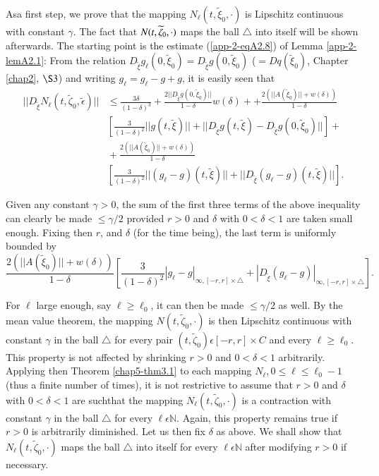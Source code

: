 \medskip
{} As\pageoriginale a first
step, we prove that the mapping $N_{\ell}(t,  \widetilde{\xi}_{0},
\cdot)$ is Lipschitz continuous with constant $\gamma$. The fact that
$N(t,\break\widetilde{\zeta}_{0}, \cdot)$ maps the ball $\triangle$ into
itself will be shown afterwards. The starting point is the estimate
(\ref{app-2-eqA2.8}) of Lemma \ref{app-2-lemA2.1}: From the relation $D_{
  \widetilde{\xi}}g_{\ell}(0,  \widetilde{\xi}_{0}) = D_{
  \widetilde{\xi}}g(0,  \widetilde{\xi}_{0})$ ($= Dq(
\widetilde{\xi}_{0})$, Chapter \ref{chap2}, $\S 3$) and writing
$g_{\ell} = g_{\ell} - g + g$, it is easily seen that
\begin{align*}
||D_{ \widetilde{\xi}}N_{\ell} (t,  \widetilde{\zeta}_{0},
\widetilde{\epsilon})|| & \leq \frac{3\delta}{(1 - \delta)^{3}} +
\frac{2||D_{ \widetilde{\xi}}g(0,  \widetilde{\xi}_{0})||}{1 - \delta}
w(\delta) +
 + \frac{2(||A( \widetilde{\xi}_{0})|| + w(\delta))}{1 - \delta}\\
&\left[\frac{3}{(1 - \delta)^{2}} ||g(t,  \widetilde{\xi})|| + ||D_{
    \widetilde{\xi}}g(t,  \widetilde{\xi}) - D_{ \widetilde{\xi}}g(0,
  \widetilde{\xi}_{0})||\right] +\\
&{} + \frac{2(||A( \widetilde{\xi}_{0})|| + w(\delta))}{1 - \delta}\\
&\left[\frac{3}{(1-\delta)^{2}} ||(g_{\ell} - g)(t,  \widetilde{\xi})||
+ ||D_{ \widetilde{\xi}}(g_{\ell} - g)(t,  \widetilde{\xi})||\right].
\end{align*}

Given any constant $\gamma > 0$, the sum of the first three terms of
the above inequality can clearly be made $\leq \gamma / 2$ provided $r
> 0$ and $\delta$ with $0 < \delta < 1$ are taken small enough. Fixing
then $r$, and $\delta$ (for the time being), the last term is uniformly
bounded by
$$
\frac{2(||A( \widetilde{\xi}_{0})|| + w(\delta))}{1-\delta}
\left[\frac{3}{(1-\delta)^{2}} |g_{\ell}-g|_{\infty, [-r, r] \times
    \triangle} + |D_{ \widetilde{\xi}}(g_{\ell}-g)|_{\infty, [-r, r]
    \times \triangle}\right].
$$

For $\ell$ large enough, say $\ell \geq \ell_{0}$, it can then be made
$\leq \gamma / 2$ as well. By the mean value theorem, the mapping
$N(t,  \widetilde{\zeta}_{0}, \cdot)$ is then Lipschitz continuous
with constant $\gamma$ in the ball $\triangle$ for every pair $(t,
\widetilde{\zeta}_{0}) \epsilon [-r, r] \times C$ and every $\ell \geq
\ell_{0}$. This property is not affected by shrinking $r > 0$ and $0 <
\delta < 1$ arbitrarily. Applying then Theorem \ref{chap5-thm3.1} to
each mapping $N_{\ell}, 0 \leq \ell \leq \ell_{0} - 1$ (thus a finite
number of times), it is not restrictive to assume that $r > 0$ and
$\delta$ with $0 < \delta < 1$ are such\pageoriginale that the mapping $N_{\ell}(t,
\widetilde{\zeta}_{0}, \cdot)$ is a contraction with constant $\gamma$
in the ball $\triangle$ for every $\ell \epsilon \mathbb{N}$. Again,
this property remains true if $r > 0$ is arbitrarily diminished. Let us
then fix $\delta$ as above. We shall show that $N_{\ell}(t,
\widetilde{\zeta}_{0}, \cdot)$ maps the ball $\triangle$ into itself
for every $\ell \epsilon \mathbb{N}$ after modifying $r > 0$ if
necessary.

